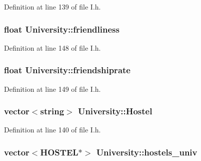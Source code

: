 \-Definition at line 139 of file \-I.\-h.

\hypertarget{classUniversity_a181ad9e668561d90f10b66bf854d4ba2}{
\subsubsection[{friendliness}]{\setlength{\rightskip}{0pt plus 5cm}float {\bf \-University\-::friendliness}}}\label{classUniversity_a181ad9e668561d90f10b66bf854d4ba2}


\-Definition at line 148 of file \-I.\-h.

\hypertarget{classUniversity_a5023351ab532628cb001316d80c218d8}{
\subsubsection[{friendshiprate}]{\setlength{\rightskip}{0pt plus 5cm}float {\bf \-University\-::friendshiprate}}}\label{classUniversity_a5023351ab532628cb001316d80c218d8}


\-Definition at line 149 of file \-I.\-h.

\hypertarget{classUniversity_a1d9f62950f9b15a745c81229297cb2e4}{
\subsubsection[{\-Hostel}]{\setlength{\rightskip}{0pt plus 5cm}vector$<$string$>$ {\bf \-University\-::\-Hostel}}}\label{classUniversity_a1d9f62950f9b15a745c81229297cb2e4}


\-Definition at line 140 of file \-I.\-h.

\hypertarget{classUniversity_abf7a35c654932d72806d1e682a89e5a0}{
\subsubsection[{hostels\-\_\-univ}]{\setlength{\rightskip}{0pt plus 5cm}vector$<${\bf \-H\-O\-S\-T\-E\-L}$\ast$$>$ {\bf \-University\-::hostels\-\_\-univ}}}\label{classUniversity_abf7a35c654932d72806d1e682a89e5a0}


